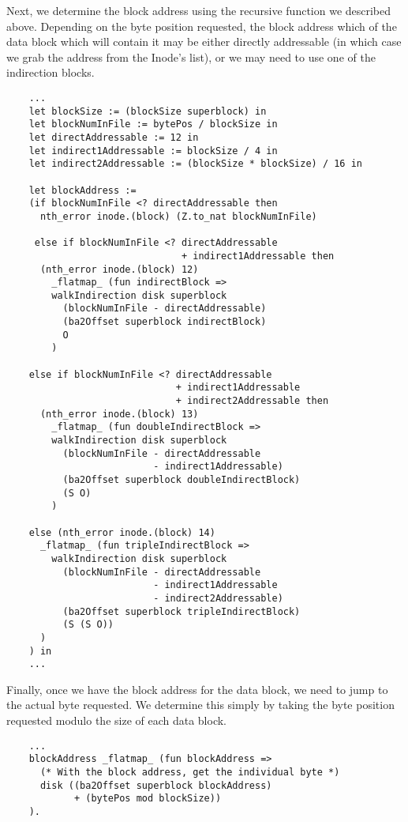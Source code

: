 \documentclass[nocopyrightspace]{sigplanconf}
\begin{document}
Next, we determine the block address using the recursive function we described
above. Depending on the byte position requested, the block address which of
the data block which will contain it may be either directly addressable (in
which case we grab the address from the Inode's list), or we may need to use
one of the indirection blocks.
\begin{lstlisting}
    ...
    let blockSize := (blockSize superblock) in
    let blockNumInFile := bytePos / blockSize in
    let directAddressable := 12 in
    let indirect1Addressable := blockSize / 4 in
    let indirect2Addressable := (blockSize * blockSize) / 16 in

    let blockAddress :=
    (if blockNumInFile <? directAddressable then
      nth_error inode.(block) (Z.to_nat blockNumInFile)

     else if blockNumInFile <? directAddressable
                               + indirect1Addressable then
      (nth_error inode.(block) 12) 
        _flatmap_ (fun indirectBlock =>
        walkIndirection disk superblock
          (blockNumInFile - directAddressable)
          (ba2Offset superblock indirectBlock) 
          O
        )

    else if blockNumInFile <? directAddressable
                              + indirect1Addressable
                              + indirect2Addressable then
      (nth_error inode.(block) 13) 
        _flatmap_ (fun doubleIndirectBlock =>
        walkIndirection disk superblock 
          (blockNumInFile - directAddressable
                          - indirect1Addressable)
          (ba2Offset superblock doubleIndirectBlock)
          (S O)
        )

    else (nth_error inode.(block) 14) 
      _flatmap_ (fun tripleIndirectBlock =>
        walkIndirection disk superblock 
          (blockNumInFile - directAddressable
                          - indirect1Addressable
                          - indirect2Addressable)
          (ba2Offset superblock tripleIndirectBlock) 
          (S (S O))
      )
    ) in
    ...
\end{lstlisting}

Finally, once we have the block address for the data block, we need to jump to
the actual byte requested. We determine this simply by taking the byte
position requested modulo the size of each data block.

\begin{lstlisting}
    ...
    blockAddress _flatmap_ (fun blockAddress =>
      (* With the block address, get the individual byte *)
      disk ((ba2Offset superblock blockAddress) 
            + (bytePos mod blockSize))
    ).
\end{lstlisting}
\end{document}
